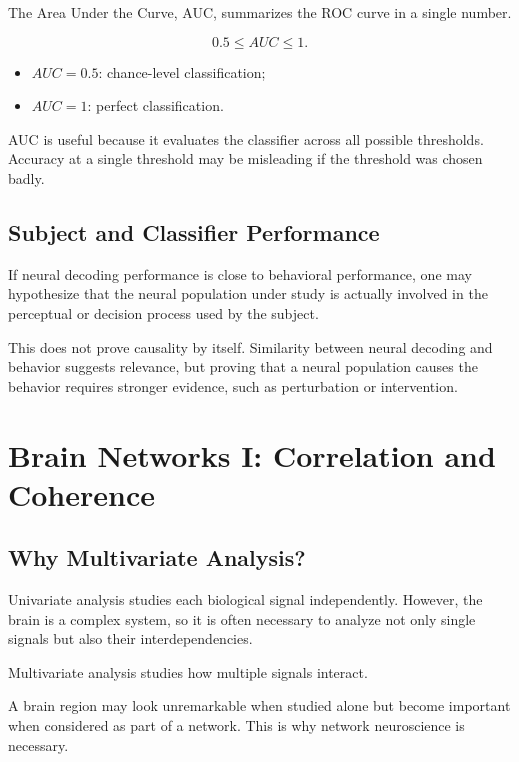 The Area Under the Curve, AUC, summarizes the ROC curve in a single number.

\[
0.5 \leq AUC \leq 1.
\]

\begin{itemize}[noitemsep]
    \item $AUC = 0.5$: chance-level classification;
    \item $AUC = 1$: perfect classification.
\end{itemize}

\begin{authornote}
AUC is useful because it evaluates the classifier across all possible thresholds. Accuracy at a single threshold may be misleading if the threshold was chosen badly.
\end{authornote}

\subsection{Subject and Classifier Performance}

If neural decoding performance is close to behavioral performance, one may hypothesize that the neural population under study is actually involved in the perceptual or decision process used by the subject.

\begin{authornote}
This does not prove causality by itself. Similarity between neural decoding and behavior suggests relevance, but proving that a neural population causes the behavior requires stronger evidence, such as perturbation or intervention.
\end{authornote}

\section{Brain Networks I: Correlation and Coherence}

\subsection{Why Multivariate Analysis?}

Univariate analysis studies each biological signal independently. However, the brain is a complex system, so it is often necessary to analyze not only single signals but also their interdependencies.

Multivariate analysis studies how multiple signals interact.

\begin{authornote}
A brain region may look unremarkable when studied alone but become important when considered as part of a network. This is why network neuroscience is necessary.
\end{authornote}


